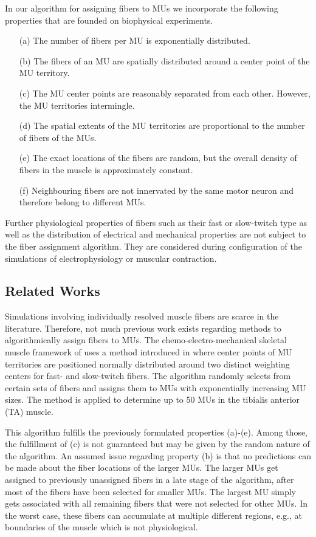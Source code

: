 In our algorithm for assigning fibers to MUs we incorporate the following properties that are founded on biophysical experiments. 
\begin{itemize}
\item[(a)] The number of fibers per MU is  exponentially distributed. 
\item[(b)] The fibers of an MU are spatially distributed around a center point of the MU territory.
\item[(c)] The MU center points are reasonably separated from each other. However, the MU territories intermingle. 
\item[(d)] The spatial extents of the MU territories are proportional to the number of fibers of the MUs. 
\item[(e)] The exact locations of the fibers are random, but the overall density of fibers in the muscle is approximately constant. 
\item[(f)] Neighbouring fibers are not innervated by the same motor neuron and therefore belong to different MUs.
\end{itemize}

Further physiological properties of fibers such as their fast or slow-twitch type as well as the distribution of electrical and mechanical properties are not subject to the fiber assignment algorithm. They are considered during configuration of the simulations of electrophysiology or muscular contraction.

\subsection{Related Works}
Simulations involving individually resolved muscle fibers are scarce in the literature. Therefore, not much previous work exists regarding methods to algorithmically assign fibers to MUs. The chemo-electro-mechanical skeletal muscle framework of \cite{Heidlauf2013} uses a method introduced in \cite{Roehrle2012} where center points of MU territories are positioned normally distributed around two distinct weighting centers for fast- and slow-twitch fibers. 
The algorithm randomly selects from certain sets of fibers and assigns them to MUs with exponentially increasing MU sizes. 
The method is applied to determine up to 50 MUs in the tibialis anterior (TA) muscle.

This algorithm fulfills the previously formulated properties (a)-(e). Among those, the fulfillment of (c) is not guaranteed but may be given by the random nature of the algorithm. An assumed issue regarding property (b) is that no predictions can be made about the fiber locations of the larger MUs. The larger MUs get assigned to previously unassigned fibers in a late stage of the algorithm, after most of the fibers have been selected for smaller MUs. The largest MU simply gets associated with all remaining fibers that were not selected for other MUs. In the worst case, these fibers can accumulate at multiple different regions, e.g., at boundaries of the muscle which is not physiological.

